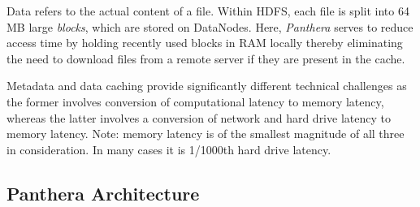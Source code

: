 \documentclass[12pt]{article}
\begin{document}
Data refers to the actual content of a file. Within HDFS, each file is split into 64 MB large \textit{blocks}, which are stored on DataNodes. Here, \textit{Panthera} serves to reduce access time by holding recently used blocks in RAM locally thereby eliminating the need to download files from a remote server if they are present in the cache.

Metadata and data caching provide significantly different technical challenges as the former involves conversion of computational latency to memory latency, whereas the latter involves a conversion of network and hard drive latency to memory latency. Note: memory latency is of the smallest magnitude of all three in consideration. In many cases \cite{ramcloud} it is 1/1000th hard drive latency.

\subsection{Panthera Architecture} \label{architecture_sect}
\end{document}
